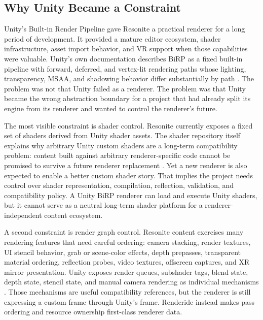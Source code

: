 \documentclass[acmtog,screen,nonacm]{acmart}
\begin{document}
\subsection{Why Unity Became a Constraint}

Unity's Built-in Render Pipeline gave Resonite a practical renderer for a long period of development. It provided a mature editor ecosystem, shader infrastructure, asset import behavior, and VR support when those capabilities were valuable. Unity's own documentation describes BiRP as a fixed built-in pipeline with forward, deferred, and vertex-lit rendering paths whose lighting, transparency, MSAA, and shadowing behavior differ substantially by path \citep{unityRenderingPaths,unityFeatureComparison}. The problem was not that Unity failed as a renderer. The problem was that Unity became the wrong abstraction boundary for a project that had already split its engine from its renderer and wanted to control the renderer's future.

The most visible constraint is shader control. Resonite currently exposes a fixed set of shaders derived from Unity shader assets. The shader repository itself explains why arbitrary Unity custom shaders are a long-term compatibility problem: content built against arbitrary renderer-specific code cannot be promised to survive a future renderer replacement \citep{resoniteUnityShaders}. Yet a new renderer is also expected to enable a better custom shader story. That implies the project needs control over shader representation, compilation, reflection, validation, and compatibility policy. A Unity BiRP renderer can load and execute Unity shaders, but it cannot serve as a neutral long-term shader platform for a renderer-independent content ecosystem.

A second constraint is render graph control. Resonite content exercises many rendering features that need careful ordering: camera stacking, render textures, UI stencil behavior, grab or scene-color effects, depth prepasses, transparent material ordering, reflection probes, video textures, offscreen captures, and XR mirror presentation. Unity exposes render queues, subshader tags, blend state, depth state, stencil state, and manual camera rendering as individual mechanisms \citep{unityBuiltInRenderingOrder,unitySubShaderTags,unityShaderLabBlend,unityShaderLabStencil,unityShaderLabCullDepth,unityCameraRender}. Those mechanisms are useful compatibility references, but the renderer is still expressing a custom frame through Unity's frame. Renderide instead makes pass ordering and resource ownership first-class renderer data.
\end{document}
